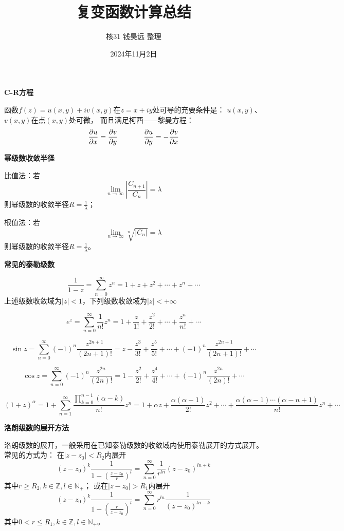 \documentclass[a4paper,12pt]{article}
\title{复变函数计算总结}
\author{核31\kern 36pt 钱昊远\kern 12pt 整理}
\date{2024年11月2日}
\begin{document}
\maketitle

\noindent
\textbf{C-R方程}

函数$f\left(z\right)=u\left(x,y\right)+iv\left(x,y\right)$在$z=x+iy$处可导的充要条件是：
$u\left(x,y\right)$、$v\left(x,y\right)$在点$\left(x,y\right)$处可微，
而且满足柯西——黎曼方程：
$$
\frac{\partial u}{\partial x}=\frac{\partial v}{\partial y}\kern 36pt
\frac{\partial u}{\partial y}=-\frac{\partial v}{\partial x}
$$

\noindent
\textbf{幂级数收敛半径}

比值法：若
$$
\lim_{n\to\infty}\left|\frac{C_{n+1}}{C_n}\right|=\lambda
$$
则幂级数的收敛半径$R=\frac1\lambda$；

根值法：若
$$
\lim_{n\to\infty}\sqrt[n]{\left|C_n\right|}=\lambda
$$
则幂级数的收敛半径$R=\frac1\lambda$。

\noindent
\textbf{常见的泰勒级数}

$$
\frac1{1-z}=\sum_{n=0}^\infty z^n
=1+z+z^2+\cdots+z^n+\cdots
$$
上述级数收敛域为$\left|z\right|<1$，下列级数收敛域为$\left|z\right|<+\infty$

$$
e^z=\sum_{n=0}^\infty \frac1{n!}z^n
=1+\frac{z}{1!}+\frac{z^2}{2!}+\cdots+\frac{z^n}{n!}+\cdots
$$

$$
\sin z=\sum_{n=0}^\infty \left(-1\right)^n\frac{z^{2n+1}}{\left(2n+1\right)!}
=z-\frac{z^3}{3!}+\frac{z^5}{5!}+\cdots+
\left(-1\right)^n\frac{z^{2n+1}}{\left(2n+1\right)!}+\cdots
$$

$$
\cos z=\sum_{n=0}^\infty \left(-1\right)^n\frac{z^{2n}}{\left(2n\right)!}
=1-\frac{z^2}{2!}+\frac{z^4}{4!}+\cdots+
\left(-1\right)^n\frac{z^{2n}}{\left(2n\right)!}+\cdots
$$

$$
\left(1+z\right)^\alpha=1+\sum_{n=1}^\infty\frac{\prod_{k=0}^{n-1}\left(\alpha-k\right)}{n!}z^n
=1+\alpha z+\frac{\alpha\left(\alpha-1\right)}{2!}z^2+\cdots+
\frac{\alpha\left(\alpha-1\right)\cdots\left(\alpha-n+1\right)}{n!}z^n+\cdots
$$

\noindent
\textbf{洛朗级数的展开方法}

洛朗级数的展开，一般采用在已知泰勒级数的收敛域内使用泰勒展开的方式展开。常见的方式为：
在$\left|z-z_0\right|<R_2$内展开
$$
\left(z-z_0\right)^k\frac1{1-\left(\frac{z-z_0}{r}\right)^l}=
\sum_{n=0}^\infty \frac1{r^{ln}}\left(z-z_0\right)^{ln+k}
$$
其中$r\ge R_2,k\in\mathbb{Z},l\in\mathbb{N}_+$；
或在$\left|z-z_0\right|>R_1$内展开
$$
\left(z-z_0\right)^k\frac1{1-\left(\frac{r}{z-z_0}\right)^l}=
\sum_{n=0}^\infty r^{ln}\frac1{\left(z-z_0\right)^{ln-k}}
$$
其中$0<r\le R_1,k\in\mathbb{Z},l\in\mathbb{N}_+$。
\end{document}
